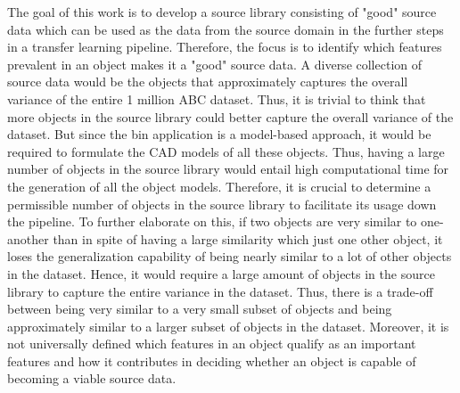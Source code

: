 The goal of this work is to develop a source library consisting of "good" source data which can be used as the data from the source domain in the further steps in a transfer learning pipeline. Therefore, the focus is to identify which features prevalent in an object makes it a "good" source data. A diverse collection of source data would be the objects that approximately captures the overall variance of the entire 1 million ABC dataset. Thus, it is trivial to think that more objects in the source library could better capture the overall variance of the dataset. But since the bin application is a model-based approach, it would be required to formulate the \ac{CAD} models of all these objects. Thus, having a large number of objects in the source library would entail high computational time for the generation of all the object models. Therefore, it is crucial to determine a permissible number of objects in the source library to facilitate its usage down the pipeline.  To further elaborate on this, if two objects are very similar to one-another than in spite of having a large similarity which just one other object, it loses the generalization capability of being nearly similar to a lot of other objects in the dataset. Hence, it would require a large amount of objects in the source library to capture the entire variance in the dataset. Thus, there is a trade-off between being very similar to a very small subset of objects and being approximately similar to a larger subset of objects in the dataset. Moreover, it is not universally defined which features in an object qualify as an important features and how it contributes in deciding whether an object is capable of becoming a viable source data. 

